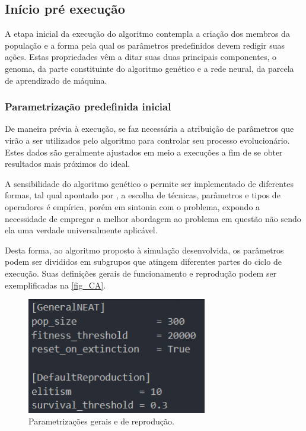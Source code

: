 \subsection{Início pré execução}
A etapa inicial da execução do algoritmo contempla a criação dos membros da população
e a forma pela qual os parâmetros predefinidos devem redigir suas ações. Estas propriedades
vêm a ditar suas duas principais componentes, o genoma, da parte constituinte do algoritmo
genético e a rede neural, da parcela de aprendizado de máquina.

\subsubsection{Parametrização predefinida inicial}
De maneira prévia à execução, se faz necessária a atribuição de parâmetros que virão a ser
utilizados pelo algoritmo para controlar seu processo evolucionário. Estes dados são geralmente
ajustados em meio a execuções a fim de se obter resultados mais próximos do ideal.

A sensibilidade do algoritmo genético o permite ser implementado de diferentes formas,
tal qual apontado por , a escolha de técnicas, parâmetros e tipos de operadores
é empírica, porém em sintonia com o problema, expondo a necessidade de empregar a melhor abordagem
ao problema em questão não sendo ela uma verdade universalmente aplicável.

Desta forma, ao algoritmo proposto à simulação desenvolvida, os parâmetros podem ser divididos em
subgrupos que atingem diferentes partes do ciclo de execução. Suas definições gerais de funcionamento
e reprodução podem ser exemplificadas na \autoref{fig_CA}.

\begin{figure}[htb]
        \centering
        \caption{\label{fig_CA}Parametrizações gerais e de reprodução.}
        \includegraphics[width=0.7\textwidth]{images/CA.png}
\end{figure}

